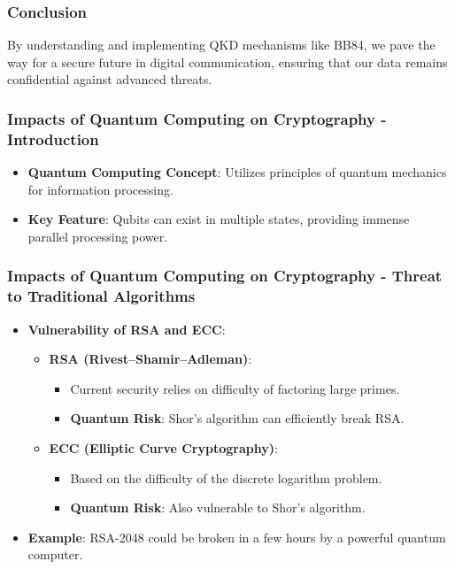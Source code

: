 \documentclass{beamer}
\begin{document}
\begin{frame}[fragile]
    \frametitle{Conclusion}
    By understanding and implementing QKD mechanisms like BB84, we pave the way for a secure future in digital communication, ensuring that our data remains confidential against advanced threats.
\end{frame}

\begin{frame}[fragile]
    \frametitle{Impacts of Quantum Computing on Cryptography - Introduction}
    \begin{itemize}
        \item \textbf{Quantum Computing Concept}: Utilizes principles of quantum mechanics for information processing.
        \item \textbf{Key Feature}: Qubits can exist in multiple states, providing immense parallel processing power.
    \end{itemize}
\end{frame}

\begin{frame}[fragile]
    \frametitle{Impacts of Quantum Computing on Cryptography - Threat to Traditional Algorithms}
    \begin{itemize}
        \item \textbf{Vulnerability of RSA and ECC}:
        \begin{itemize}
            \item \textbf{RSA (Rivest–Shamir–Adleman)}:
            \begin{itemize}
                \item Current security relies on difficulty of factoring large primes.
                \item \textbf{Quantum Risk}: Shor's algorithm can efficiently break RSA.
            \end{itemize}
            \item \textbf{ECC (Elliptic Curve Cryptography)}:
            \begin{itemize}
                \item Based on the difficulty of the discrete logarithm problem.
                \item \textbf{Quantum Risk}: Also vulnerable to Shor's algorithm.
            \end{itemize}
        \end{itemize}
        \item \textbf{Example}: RSA-2048 could be broken in a few hours by a powerful quantum computer.
    \end{itemize}
\end{frame}
\end{document}
